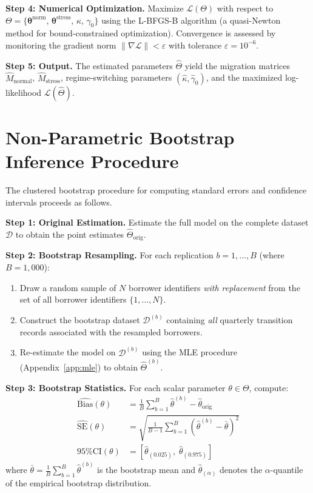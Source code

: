 \documentclass[12pt,a4paper]{article}
\begin{document}
\textbf{Step 4: Numerical Optimization.} Maximize $\mathcal{L}(\Theta)$ with respect to $\Theta = \{\boldsymbol{\theta}^{\text{norm}},\, \boldsymbol{\theta}^{\text{stress}},\, \kappa,\, \gamma_0\}$ using the L-BFGS-B algorithm (a quasi-Newton method for bound-constrained optimization). Convergence is assessed by monitoring the gradient norm $\|\nabla \mathcal{L}\| < \varepsilon$ with tolerance $\varepsilon = 10^{-6}$.

\textbf{Step 5: Output.} The estimated parameters $\hat{\Theta}$ yield the migration matrices $\hat{M}_{\text{normal}}$, $\hat{M}_{\text{stress}}$, regime-switching parameters $(\hat{\kappa}, \hat{\gamma}_0)$, and the maximized log-likelihood $\mathcal{L}(\hat{\Theta})$.

\section{Non-Parametric Bootstrap Inference Procedure}
\label{app:bootstrap}

The clustered bootstrap procedure for computing standard errors and confidence intervals proceeds as follows.

\textbf{Step 1: Original Estimation.} Estimate the full model on the complete dataset $\mathcal{D}$ to obtain the point estimates $\hat{\Theta}_{\text{orig}}$.

\textbf{Step 2: Bootstrap Resampling.} For each replication $b = 1, \ldots, B$ (where $B = 1{,}000$):
\begin{enumerate}[noitemsep]
    \item Draw a random sample of $N$ borrower identifiers \textit{with replacement} from the set of all borrower identifiers $\{1, \ldots, N\}$.
    \item Construct the bootstrap dataset $\mathcal{D}^{(b)}$ containing \textit{all} quarterly transition records associated with the resampled borrowers.
    \item Re-estimate the model on $\mathcal{D}^{(b)}$ using the MLE procedure (Appendix~\ref{app:mle}) to obtain $\hat{\Theta}^{(b)}$.
\end{enumerate}

\textbf{Step 3: Bootstrap Statistics.} For each scalar parameter $\theta \in \Theta$, compute:
\begin{align}
\widehat{\text{Bias}}(\theta) &= \frac{1}{B} \sum_{b=1}^{B} \hat{\theta}^{(b)} - \hat{\theta}_{\text{orig}} \\
\widehat{\text{SE}}(\theta) &= \sqrt{\frac{1}{B-1} \sum_{b=1}^{B} \left(\hat{\theta}^{(b)} - \bar{\theta}\right)^2} \\
\text{95\% CI}(\theta) &= \left[\hat{\theta}_{(0.025)},\; \hat{\theta}_{(0.975)}\right]
\end{align}
where $\bar{\theta} = \frac{1}{B}\sum_{b=1}^{B} \hat{\theta}^{(b)}$ is the bootstrap mean and $\hat{\theta}_{(\alpha)}$ denotes the $\alpha$-quantile of the empirical bootstrap distribution.
\end{document}
